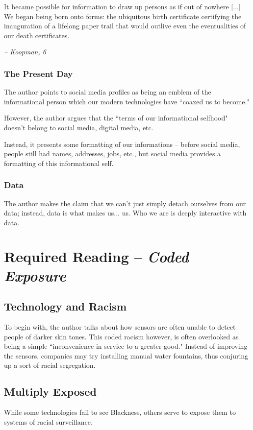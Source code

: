 \documentclass[openany]{book}
\begin{document}
\begin{fancyquotes}
	It became possible for information to draw up persons as if out of nowhere [...] We began being born onto forms: the ubiquitous birth certificate certifying the inauguration of a lifelong paper trail that would outlive even the eventualities of our death certificates.
	
	\begin{flushright}
		\emph{\textit{-- Koopman, 6}}
	\end{flushright}
\end{fancyquotes}

\subsubsection{The Present Day}
The author points to social media profiles as being an emblem of the informational person which our modern technologies have ``coaxed us to become."

However, the author argues that the ``terms of our informational selfhood" doesn't belong to social media, digital media, etc.

Instead, it presents some formatting of our informations -- before social media, people still had names, addresses, jobs, etc., but social media provides a formatting of this informational self.

\subsubsection{Data}
The author makes the claim that we can't just simply detach ourselves from our data; instead, data is what makes us... us. Who we are is deeply interactive with data.

\section{Required Reading -- \textit{Coded Exposure}}
\subsection{Technology and Racism}
To begin with, the author talks about how sensors are often unable to detect people of darker skin tones. This coded racism however, is often overlooked as being a simple ``inconvenience in service to a greater good." Instead of improving the sensors, companies may try installing manual water fountains, thus conjuring up a sort of racial segregation.

\subsection{Multiply Exposed}
While some technologies fail to see Blackness, others serve to expose them to systems of racial surveillance.
\end{document}
